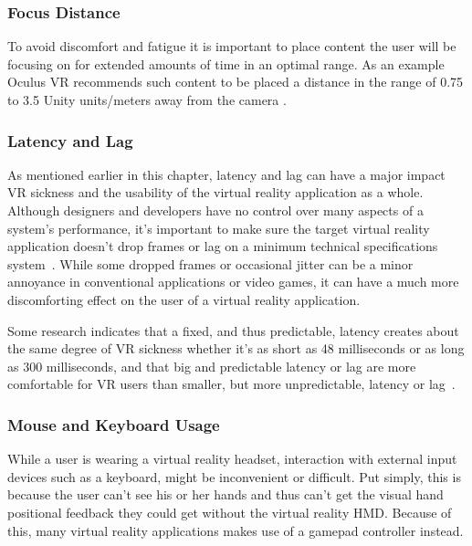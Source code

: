 \subsubsection{Focus Distance}
To avoid discomfort and fatigue it is important to place content the user will be focusing on for extended amounts of time in an optimal range.
As an example Oculus VR recommends such content to be placed a distance in the range of 0.75 to 3.5 Unity units/meters away from the camera \citep{OCULUS2016}. 

\subsubsection{Latency and Lag}
As mentioned earlier in this chapter, latency and lag can have a major impact VR sickness and the usability of the virtual reality application as a whole.
Although designers and developers have no control over many aspects of a system's performance, it's important to make sure the target virtual reality application
doesn't drop frames or lag on a minimum technical specifications system~\citep{OCULUS2016}. While some dropped frames or occasional jitter can be a minor annoyance
in conventional applications or video games, it can have a much more discomforting effect on the user of a virtual reality application. 

Some research indicates that a fixed, and thus predictable, latency creates about the same degree of VR sickness whether it's as short as 48 milliseconds or as long 
as 300 milliseconds, and that big and predictable latency or lag are more comfortable for VR users than smaller, but more unpredictable, latency or lag~\citep{Draper2001}. 

\subsubsection{Mouse and Keyboard Usage}
While a user is wearing a virtual reality headset, interaction with external input devices such as a keyboard, might be inconvenient or difficult. 
Put simply, this is because the user can't see his or her hands and thus can't get the visual hand positional feedback they could get without the virtual reality HMD. 
Because of this, many virtual reality applications makes use of a gamepad controller instead. %







